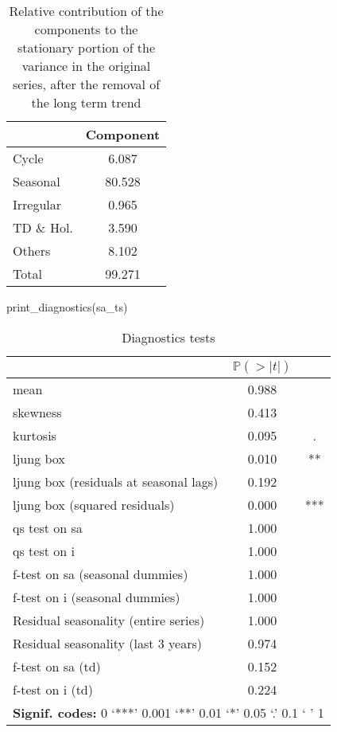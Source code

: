 \documentclass[
]{article}
\newenvironment{Shaded}{\begin{snugshade}}{\end{snugshade}}
\newcommand{\FunctionTok}[1]{\textcolor[rgb]{0.00,0.00,0.00}{#1}}
\newcommand{\NormalTok}[1]{#1}
\begin{document}
\begin{table}[H]
\centering
\caption{\label{tab:unnamed-chunk-4}Relative contribution of the components to the stationary portion of the variance in the original series, after the removal of the long term trend}
\centering
\begin{tabular}[t]{lc}
\toprule
  & Component\\
\midrule
Cycle & 6.087\\
Seasonal & 80.528\\
Irregular & 0.965\\
TD \& Hol. & 3.590\\
Others & 8.102\\
\addlinespace
Total & 99.271\\
\bottomrule
\end{tabular}
\end{table}

\begin{Shaded}
\begin{Highlighting}[]
\FunctionTok{print\_diagnostics}\NormalTok{(sa\_ts)}
\end{Highlighting}
\end{Shaded}

\begin{table}[H]
\centering
\caption{\label{tab:unnamed-chunk-4}Diagnostics tests}
\centering
\begin{tabular}[t]{l|c|c}
\hline
  & $\mathbb P (> \lvert t \rvert)$ & \\
\hline
mean & 0.988 & \\
\hline
skewness & 0.413 & \\
\hline
kurtosis & 0.095 & .\\
\hline
ljung box & 0.010 & **\\
\hline
ljung box (residuals at seasonal lags) & 0.192 & \\
\hline
ljung box (squared residuals) & 0.000 & ***\\
\hline
qs test on sa & 1.000 & \\
\hline
qs test on i & 1.000 & \\
\hline
f-test on sa (seasonal dummies) & 1.000 & \\
\hline
f-test on i (seasonal dummies) & 1.000 & \\
\hline
Residual seasonality (entire series) & 1.000 & \\
\hline
Residual seasonality (last 3 years) & 0.974 & \\
\hline
f-test on sa (td) & 0.152 & \\
\hline
f-test on i (td) & 0.224 & \\
\hline
\multicolumn{3}{l}{\rule{0pt}{1em}\textbf{Signif. codes: }0 `***' 0.001 `**' 0.01 `*' 0.05 `.' 0.1 ` ' 1}\\
\end{tabular}
\end{table}
\end{document}
